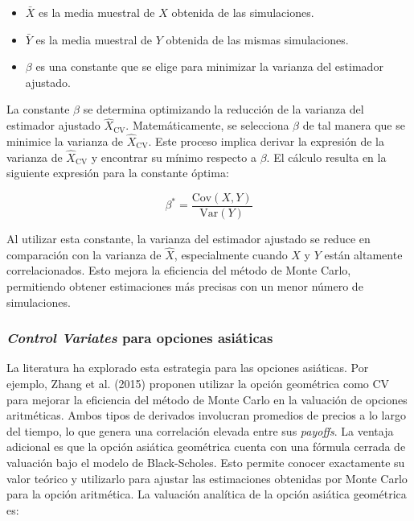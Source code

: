\documentclass[11pt,a4paper,spanish]{article}
\numberwithin{equation}{section} %
\begin{document}
\begin{itemize}
    \item \( \bar{X} \) es la media muestral de \( X \) obtenida de las simulaciones.
    \item \( \bar{Y} \) es la media muestral de \( Y \) obtenida de las mismas simulaciones.
    \item \( \beta \) es una constante que se elige para minimizar la varianza del estimador ajustado.
\end{itemize}

La constante \( \beta \) se determina optimizando la reducción de la varianza del estimador ajustado \( \hat{X}_{\text{CV}} \). Matemáticamente, se selecciona \( \beta \) de tal manera que se minimice la varianza de \( \hat{X}_{\text{CV}} \). Este proceso implica derivar la expresión de la varianza de \( \hat{X}_{\text{CV}} \) y encontrar su mínimo respecto a \( \beta \). El cálculo resulta en la siguiente expresión para la constante óptima:

\begin{equation}
\beta^* = \frac{\text{Cov}(X, Y)}{\text{Var}(Y)}
\end{equation}

Al utilizar esta constante, la varianza del estimador ajustado se reduce en comparación con la varianza de \( \hat{X} \), especialmente cuando \( X \) y \( Y \) están altamente correlacionados. Esto mejora la eficiencia del método de Monte Carlo, permitiendo obtener estimaciones más precisas con un menor número de simulaciones.

\subsubsection{\textit{Control Variates} para opciones asiáticas}
La literatura ha explorado esta estrategia para las opciones asiáticas. Por ejemplo, Zhang et al. (2015) proponen utilizar la opción geométrica como CV para mejorar la eficiencia del método de Monte Carlo en la valuación de opciones aritméticas. Ambos tipos de derivados involucran promedios de precios a lo largo del tiempo, lo que genera una correlación elevada entre sus \textit{payoffs}. La ventaja adicional es que la opción asiática geométrica cuenta con una fórmula cerrada de valuación bajo el modelo de Black-Scholes. Esto permite conocer exactamente su valor teórico y utilizarlo para ajustar las estimaciones obtenidas por Monte Carlo para la opción aritmética. La valuación analítica de la opción asiática geométrica es:
\end{document}
